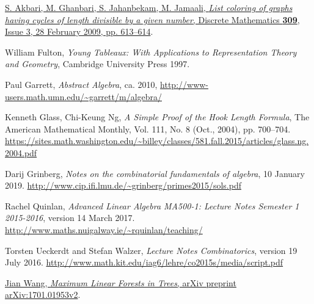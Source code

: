 \documentclass[numbers=enddot,12pt,final,onecolumn,notitlepage]{scrartcl}%
\theoremstyle{definition}
\begin{document}
\begin{thebibliography}{9999999999}                                                                                       %

\href{http://www.sciencedirect.com/science/article/pii/S0012365X08005244}{S. Akbari, M. Ghanbari, S. Jahanbekam, M. Jamaali, \textit{List coloring of graphs having cycles of length divisible by a given number}, Discrete Mathematics \textbf{309}, Issue 3, 28 February 2009, pp. 613--614}.

William Fulton, \textit{Young Tableaux: With
Applications to Representation Theory and Geometry}, Cambridge University
Press 1997.

Paul Garrett,
\textit{Abstract Algebra},
ca. 2010,
\newline\url{http://www-users.math.umn.edu/~garrett/m/algebra/}

Kenneth Glass, Chi-Keung Ng,
\textit{A Simple Proof of the Hook Length Formula},
The American Mathematical Monthly,
Vol. 111, No. 8 (Oct., 2004), pp. 700--704.
\newline\url{https://sites.math.washington.edu/~billey/classes/581.fall.2015/articles/glass.ng.2004.pdf}

Darij Grinberg, \textit{Notes on the combinatorial
fundamentals of algebra}, 10 January 2019.
\newline\url{http://www.cip.ifi.lmu.de/~grinberg/primes2015/sols.pdf}

Rachel Quinlan,
\textit{Advanced Linear Algebra MA500-1: Lecture Notes
Semester 1 2015-2016},
version 14 March 2017.
\newline\url{http://www.maths.nuigalway.ie/~rquinlan/teaching/}

Torsten Ueckerdt and Stefan Walzer,
\textit{Lecture Notes Combinatorics},
version 19 July 2016.
\newline\url{http://www.math.kit.edu/iag6/lehre/co2015s/media/script.pdf}

\href{http://lanl.arxiv.org/abs/1701.01953v2}{Jian Wang,
\textit{Maximum Linear Forests in Trees},
arXiv preprint arXiv:1701.01953v2}.

\end{thebibliography}
\end{document}
